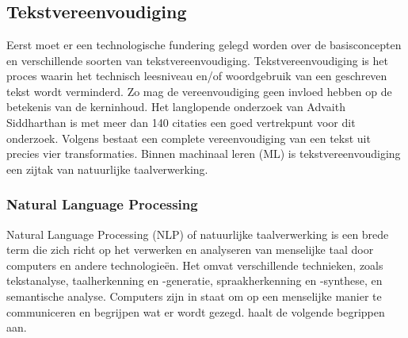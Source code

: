 \chapter{}%
\label{ch:stand-van-zaken}

\section{Tekstvereenvoudiging}

Eerst moet er een technologische fundering gelegd worden over de basisconcepten en verschillende soorten van tekstvereenvoudiging. Tekstvereenvoudiging is het proces waarin het technisch leesniveau en/of woordgebruik van een geschreven tekst wordt verminderd. Zo mag de vereenvoudiging geen invloed hebben op de betekenis van de kerninhoud. Het langlopende onderzoek van Advaith Siddharthan is met meer dan 140 citaties een goed vertrekpunt voor dit onderzoek. Volgens \autocite{Siddharthan2014} bestaat een complete vereenvoudiging van een tekst uit precies vier transformaties. Binnen machinaal leren (ML) is tekstvereenvoudiging een zijtak van natuurlijke taalverwerking. %

\subsection{Natural Language Processing}

Natural Language Processing (NLP) of natuurlijke taalverwerking is een brede term die zich richt op het verwerken en analyseren van menselijke taal door computers en andere technologieën. Het omvat verschillende technieken, zoals tekstanalyse, taalherkenning en -generatie, spraakherkenning en -synthese, en semantische analyse. Computers zijn in staat om op een menselijke manier te communiceren en begrijpen wat er wordt gezegd. \textcite{Sohom2019} haalt de volgende begrippen aan.

